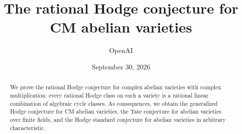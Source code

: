 \documentclass[11pt]{article}
\title{The rational Hodge conjecture for CM abelian varieties}
\author{OpenAI}
\date{September 30, 2026}
\begin{document}
\maketitle

\begin{abstract}
We prove the rational Hodge conjecture for complex abelian varieties
with complex multiplication: every rational Hodge class on such a
variety is a rational linear combination of algebraic cycle classes.
As consequences, we obtain the generalized Hodge conjecture for CM
abelian varieties, the Tate conjecture for abelian varieties over finite
fields, and the Hodge standard conjecture for abelian varieties in
arbitrary characteristic.
\end{abstract}


\tableofcontents












{}
\begingroup
\small

\endgroup
\end{document}
